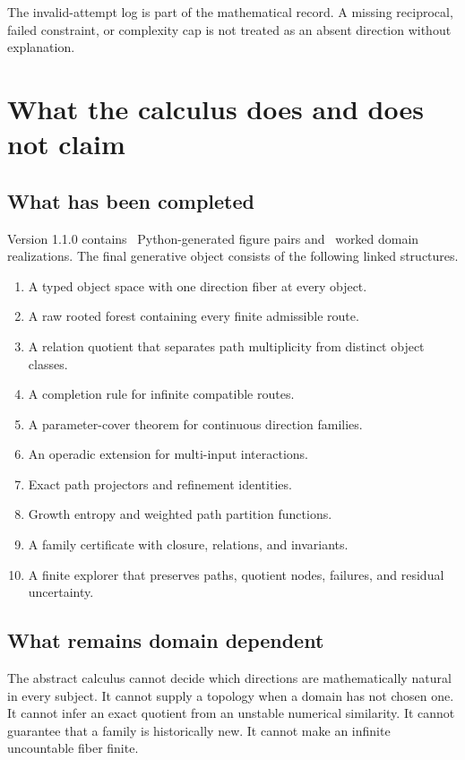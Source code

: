 \documentclass[11pt,openany]{report}
\theoremstyle{definition}
\theoremstyle{remark}
\begin{document}
The invalid-attempt log is part of the mathematical record. A missing reciprocal, failed constraint, or complexity cap is not treated as an absent direction without explanation.

\chapter{What the calculus does and does not claim}

\section{What has been completed}

Version 1.1.0 contains \FigureCount\ Python-generated figure pairs and \ExampleCount\ worked domain realizations. The final generative object consists of the following linked structures.

\begin{enumerate}[label=(\arabic*)]
\item A typed object space with one direction fiber at every object.
\item A raw rooted forest containing every finite admissible route.
\item A relation quotient that separates path multiplicity from distinct object classes.
\item A completion rule for infinite compatible routes.
\item A parameter-cover theorem for continuous direction families.
\item An operadic extension for multi-input interactions.
\item Exact path projectors and refinement identities.
\item Growth entropy and weighted path partition functions.
\item A family certificate with closure, relations, and invariants.
\item A finite explorer that preserves paths, quotient nodes, failures, and residual uncertainty.
\end{enumerate}

\section{What remains domain dependent}

The abstract calculus cannot decide which directions are mathematically natural in every subject. It cannot supply a topology when a domain has not chosen one. It cannot infer an exact quotient from an unstable numerical similarity. It cannot guarantee that a family is historically new. It cannot make an infinite uncountable fiber finite.
\end{document}
